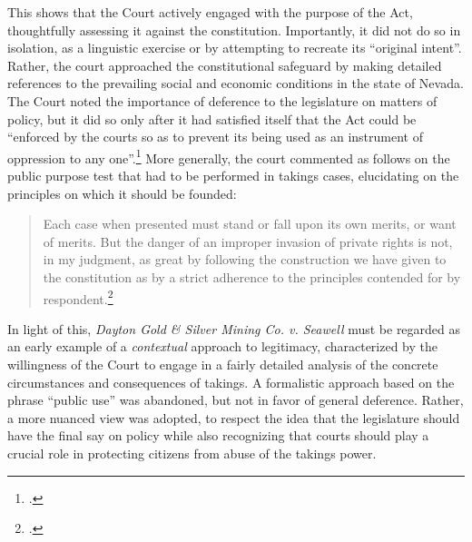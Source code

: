 \documentclass[12pt,a4paper]{book} %
\begin{document}
This shows that the Court actively engaged with the purpose of the Act, thoughtfully assessing it against the constitution. Importantly, it did not do so in isolation, as a linguistic exercise or by attempting to recreate its ``original intent''. Rather, the court approached the constitutional safeguard by making detailed references to the prevailing social and economic conditions in the state of Nevada. The Court noted the importance of deference to the legislature on matters of policy, but it did so only after it had satisfied itself that the Act could be ``enforced by the courts so as to prevent its being used as an instrument of oppression to any one''.\footcite[412]{seawell76} More generally, the court commented as follows on the public purpose test that had to be performed in takings cases, elucidating on the principles on which it should be founded:

\begin{quote}
 Each case when presented must stand or fall upon its own merits, or want of merits. But the danger of an improper invasion of private rights is not, in my judgment, as great by following the construction we have given to the constitution as by a strict adherence to the principles contended for by respondent.\footcite[398]{seawell76}
\end{quote}

In light of this, {\it Dayton Gold \& Silver Mining Co. v. Seawell} must be regarded as an early example of a {\it contextual} approach to legitimacy, characterized by the willingness of the Court to engage in a fairly detailed analysis of the concrete circumstances and consequences of takings. A formalistic approach based on the phrase ``public use'' was abandoned, but not in favor of general deference. Rather, a more nuanced view was adopted, to respect the idea that the legislature should have the final say on policy while also recognizing that courts should play a crucial role in protecting citizens from abuse of the takings power. 
\end{document}

